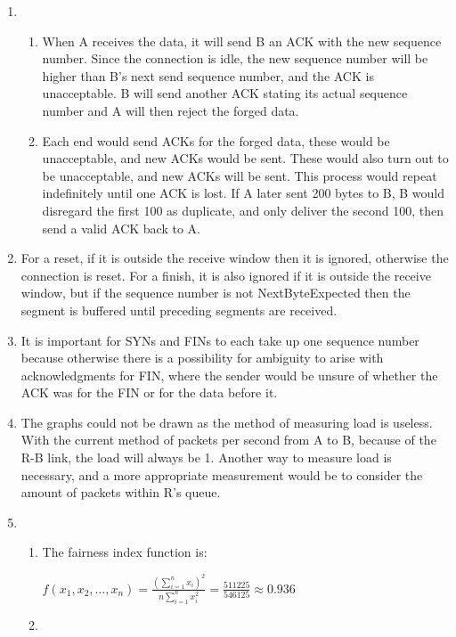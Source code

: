 \documentclass[12pt]{article}
\begin{document}
\begin{enumerate}
\begin{enumerate}
\end{enumerate}
\item %
\begin{enumerate}
\item %
When A receives the data, it will send B an ACK with the new sequence number. Since the connection is idle, the new sequence number will be higher than B's next send sequence number, and the ACK is unacceptable. B will send another ACK stating its actual sequence number and A will then reject the forged data.
\item %
Each end would send ACKs for the forged data, these would be unacceptable, and new ACKs would be sent. These would also turn out to be unacceptable, and new ACKs will be sent. This process would repeat indefinitely until one ACK is lost. If A later sent 200 bytes to B, B would disregard the first 100 as duplicate, and only deliver the second 100, then send a valid ACK back to A.
\end{enumerate}
\item %
For a reset, if it is outside the receive window then it is ignored, otherwise the connection is reset. For a finish, it is also ignored if it is outside the receive window, but if the sequence number is not NextByteExpected then the segment is buffered until preceding segments are received.
\item %
It is important for SYNs and FINs to each take up one sequence number because otherwise there is a possibility for ambiguity to arise with acknowledgments for FIN, where the sender would be unsure of whether the ACK was for the FIN or for the data before it.
\item %
The graphs could not be drawn as the method of measuring load is useless. With the current method of packets per second from A to B, because of the R-B link, the load will always be 1. Another way to measure load is necessary, and a more appropriate measurement would be to consider the amount of packets within R's queue.
\item %
\begin{enumerate}
\item %
The fairness index function is:
\begin{center}
$f(x_1,x_2,\ldots ,x_n) = \frac{(\sum_{i=1}^{n}x_i)^2}{n\sum_{i=1}^{n}x_i^2} = \frac{511225}{546125} \approx 0.936$
\end{center}
\item %

\end{enumerate}
\end{enumerate}
\end{document}
